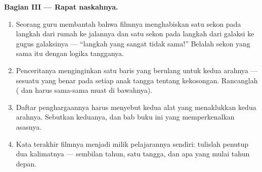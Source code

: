 \begin{problem}
\medskip\noindent\textbf{Bagian III --- Rapat
naskahnya.}
\begin{enumerate}[resume]
  \item Seorang guru membantah bahwa filmnya menghabiskan satu sekon
        pada langkah dari rumah ke jalannya dan satu sekon pada
        langkah dari galaksi ke gugus galaksinya --- ``langkah yang
        sangat tidak sama!'' Belalah sekon yang sama itu dengan logika
        tangganya.
  \item Penceritanya menginginkan satu baris yang berulang untuk kedua
        arahnya --- sesuatu yang benar pada setiap anak tangga tentang
        kekosongan. Rancanglah ( dan  harus
        sama-sama muat di bawahnya).
  \item Daftar penghargaannya harus menyebut kedua alat yang menaklukkan
        kedua arahnya. Sebutkan keduanya, dan bab buku ini yang
        memperkenalkan asasnya.
  \item Kata terakhir filmnya menjadi milik pelajarannya sendiri:
        tulislah penutup dua kalimatnya --- sembilan tahun, satu
        tangga, dan apa yang mulai tahun depan.
\end{enumerate}
\end{problem}
